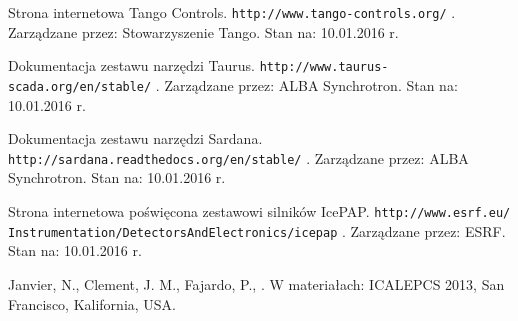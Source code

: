 \clearpage

\begin{thebibliography}{99} %

Strona internetowa Tango Controls.
\newblock \texttt{http://www.tango-controls.org/} .
\newblock Zarządzane przez: Stowarzyszenie Tango.
\newblock Stan na: 10.01.2016 r.

Dokumentacja zestawu narzędzi Taurus.
\newblock \texttt{http://www.taurus-scada.org/en/stable/} .
\newblock Zarządzane przez: ALBA Synchrotron.
\newblock Stan na: 10.01.2016 r.

Dokumentacja zestawu narzędzi Sardana.
\newblock \texttt{http://sardana.readthedocs.org/en/stable/} .
\newblock Zarządzane przez: ALBA Synchrotron.
\newblock Stan na: 10.01.2016 r.

Strona internetowa poświęcona zestawowi silników IcePAP.
\newblock \texttt{http://www.esrf.eu/\\Instrumentation/DetectorsAndElectronics/icepap} .
\newblock Zarządzane przez: ESRF.
\newblock Stan na: 10.01.2016 r.

Janvier, N., Clement, J. M., Fajardo, P.,  
.
\newblock W materiałach: ICALEPCS 2013, San Francisco, Kalifornia, USA.



\end{thebibliography}